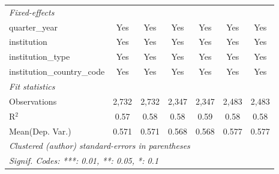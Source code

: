 \begin{tabular}{lcccccc}
   \midrule
   \emph{Fixed-effects}\\
   quarter\_year                      & Yes     & Yes           & Yes         & Yes          & Yes     & Yes\\  
   institution                        & Yes     & Yes           & Yes         & Yes          & Yes     & Yes\\  
   institution\_type                  & Yes     & Yes           & Yes         & Yes          & Yes     & Yes\\  
   institution\_country\_code         & Yes     & Yes           & Yes         & Yes          & Yes     & Yes\\  
   \midrule
   \emph{Fit statistics}\\
   Observations                       & 2,732   & 2,732         & 2,347       & 2,347        & 2,483   & 2,483\\  
   R$^2$                              & 0.57    & 0.58          & 0.58        & 0.59         & 0.58    & 0.58\\  
Mean(Dep. Var.) & 0.571 & 0.571 & 0.568 & 0.568 & 0.577 & 0.577 \\
   \midrule \midrule
   \multicolumn{7}{l}{\emph{Clustered (author) standard-errors in parentheses}}\\
   \multicolumn{7}{l}{\emph{Signif. Codes: ***: 0.01, **: 0.05, *: 0.1}}\\
\end{tabular}
\par\endgroup
